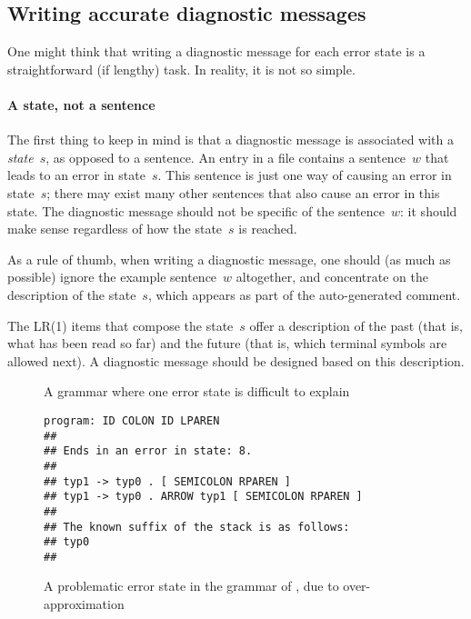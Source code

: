 \documentclass[onecolumn,11pt,nocopyrightspace,preprint]{sigplanconf}
\begin{document}
\subsection{Writing accurate diagnostic messages}
\label{sec:errors:diagnostics}

One might think that writing a diagnostic message for each error state is a
straightforward (if lengthy) task. In reality, it is not so simple.


\paragraph{A state, not a sentence}

The first thing to keep in mind is that a diagnostic message is associated
with a \emph{state}~$s$, as opposed to a sentence. An entry in a \messages
file contains a sentence~$w$ that leads to an error in state~$s$. This
sentence is just one way of causing an error in state~$s$; there may exist
many other sentences that also cause an error in this state. The diagnostic
message should not be specific of the sentence~$w$: it should make sense
regardless of how the state~$s$ is reached.

As a rule of thumb, when writing a diagnostic message, one should (as much as
possible) ignore the example sentence~$w$ altogether, and concentrate on the
description of the state~$s$, which appears as part of the auto-generated
comment.

The LR(1) items that compose the state~$s$ offer a description of the past
(that is, what has been read so far) and the future (that is, which terminal
symbols are allowed next). A diagnostic message should be designed based on
this description.

\begin{figure}

\caption{A grammar where one error state is difficult to explain}
\label{fig:declarations}
\end{figure}

\begin{figure}
\begin{verbatim}
program: ID COLON ID LPAREN
##
## Ends in an error in state: 8.
##
## typ1 -> typ0 . [ SEMICOLON RPAREN ]
## typ1 -> typ0 . ARROW typ1 [ SEMICOLON RPAREN ]
##
## The known suffix of the stack is as follows:
## typ0
##
\end{verbatim}
\caption{A problematic error state in the grammar of , due to over-approximation}
\label{fig:declarations:over}
\end{figure}
\end{document}
